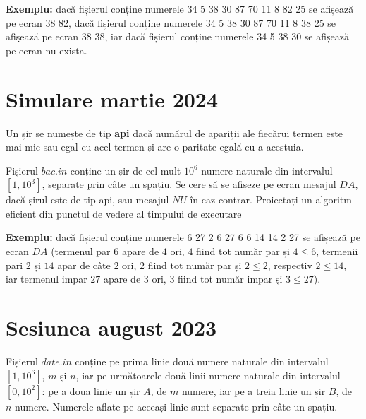 \documentclass[10pt, a4paper]{article}
\newcommand{\highlight}[1]{{\ttfamily\color{red}#1}}
\begin{document}
\vspace{0.2cm}
\noindent \textbf{Exemplu:} dacă fișierul conține numerele \highlight{34 5 38 30 87 70 11 8 82 25} se afișează pe ecran \highlight{38 82}, dacă fișierul conține numerele \highlight{34 5 38 30 87 70 11 8 38 25} se afişează pe ecran \highlight{38 38}, iar dacă fișierul conține numerele \highlight{34 5 38 30} se afișează pe ecran \highlight{nu exista}.


\section{Simulare martie 2024}
Un șir se numește de tip \textbf{api} dacă numărul de apariții ale fiecărui termen este mai mic sau egal cu acel termen și are o paritate egală cu a acestuia.

\vspace{0.2cm}
\noindent Fișierul \highlight{$bac.in$} conține un șir de cel mult \highlight{$10^6$} numere naturale din intervalul \highlight{$[1,10^3]$}, separate prin câte un spațiu. Se cere să se afișeze pe ecran mesajul \highlight{$DA$}, dacă șirul este de tip api, sau mesajul \highlight{$NU$} în caz contrar. Proiectați un algoritm eficient din punctul de vedere al timpului de executare

\vspace{0.2cm}
\noindent \textbf{Exemplu:} dacă fișierul conține numerele \highlight{6 27 2 6 27 6 6 14 14 2 27} se afișează pe ecran \highlight{$DA$} (termenul par \highlight{$6$} apare de \highlight{$4$} ori, \highlight{$4$} fiind tot număr par și \highlight{$4\leq6$}, termenii pari \highlight{$2$} și \highlight{$14$} apar de câte \highlight{$2$} ori, \highlight{$2$} fiind tot număr par și \highlight{$2\leq2$}, respectiv \highlight{$2\leq14$}, iar termenul impar \highlight{$27$} apare de \highlight{$3$} ori, \highlight{$3$} fiind tot număr impar și \highlight{$3\leq27$}).
  
\newpage
\section{Sesiunea august 2023}
Fișierul \highlight{$date.in$} conține pe prima linie două numere naturale din intervalul \highlight{$[1,10^6]$}, \highlight{$m$} și \highlight{$n$}, iar pe următoarele două linii numere naturale din intervalul \highlight{$[0,10^2]$}: pe a doua linie un șir \highlight{$A$}, de \highlight{$m$} numere, iar pe a treia linie un șir \highlight{$B$}, de \highlight{$n$} numere. Numerele aflate pe aceeași linie sunt separate prin câte un spațiu.
\end{document}
